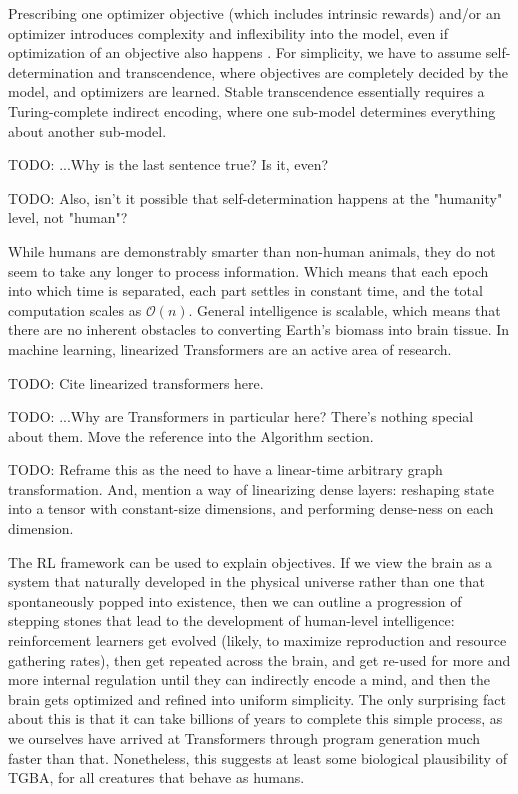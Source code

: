 \documentclass{article}
\begin{document}
Prescribing one optimizer objective (which includes intrinsic rewards) and/or an optimizer introduces complexity and inflexibility into the model, even if optimization of an objective also happens \cite{Dabney2020}. For simplicity, we have to assume self-determination and transcendence, where objectives are completely decided by the model, and optimizers are learned. Stable transcendence essentially requires a Turing-complete indirect encoding, where one sub-model determines everything about another sub-model.

    TODO: ...Why is the last sentence true? Is it, even?

    TODO: Also, isn't it possible that self-determination happens at the "humanity" level, not "human"?

While humans are demonstrably smarter than non-human animals, they do not seem to take any longer to process information. Which means that each epoch into which time is separated, each part settles in constant time, and the total computation scales as $\mathcal{O}(n)$. General intelligence is scalable, which means that there are no inherent obstacles to converting Earth's biomass into brain tissue. In machine learning, linearized Transformers are an active area of research.

    TODO: Cite linearized transformers here.

    TODO: ...Why are Transformers in particular here? There's nothing special about them. Move the reference into the Algorithm section.

    TODO: Reframe this as the need to have a linear-time arbitrary graph transformation. And, mention a way of linearizing dense layers: reshaping state into a tensor with constant-size dimensions, and performing dense-ness on each dimension.

The RL framework can be used to explain objectives. If we view the brain as a system that naturally developed in the physical universe rather than one that spontaneously popped into existence, then we can outline a progression of stepping stones that lead to the development of human-level intelligence: reinforcement learners get evolved (likely, to maximize reproduction and resource gathering rates), then get repeated across the brain, and get re-used for more and more internal regulation until they can indirectly encode a mind, and then the brain gets optimized and refined into uniform simplicity. The only surprising fact about this is that it can take billions of years to complete this simple process, as we ourselves have arrived at Transformers through program generation much faster than that. Nonetheless, this suggests at least some biological plausibility of TGBA, for all creatures that behave as humans.
\end{document}
